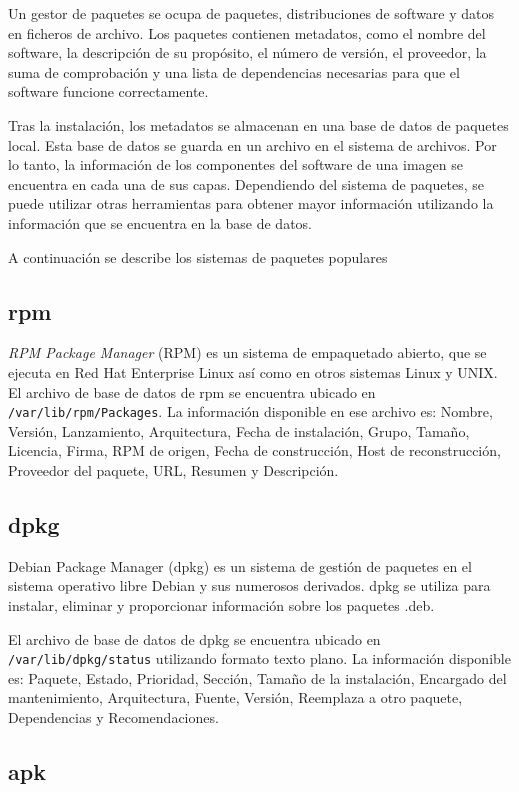 Un gestor de paquetes se ocupa de paquetes, distribuciones de software y datos en ficheros de archivo. Los paquetes contienen metadatos, como el nombre del software, la descripción de su propósito, el número de versión, el proveedor, la suma de comprobación y una lista de dependencias necesarias para que el software funcione correctamente. 

Tras la instalación, los metadatos se almacenan en una base de datos de paquetes local. Esta base de datos se guarda en un archivo en el sistema de archivos. Por lo tanto, la información de los componentes del software de una imagen se encuentra en cada una de sus capas.
Dependiendo del sistema de paquetes, se puede utilizar otras herramientas para obtener mayor información utilizando la información que se encuentra en la base de datos.

A continuación se describe los sistemas de paquetes populares

\subsection{rpm}\label{sub:rpm}
\emph{RPM Package Manager} (RPM) es un sistema de empaquetado abierto, que se ejecuta en Red Hat Enterprise Linux así como en otros sistemas Linux y UNIX.
El archivo de base de datos de rpm se encuentra ubicado en \verb|/var/lib/rpm/Packages|. La información disponible en ese archivo es: Nombre, Versión, Lanzamiento, Arquitectura, Fecha de instalación, Grupo, Tamaño, Licencia, Firma, RPM de origen, Fecha de construcción,  Host de reconstrucción, Proveedor del paquete, URL, Resumen y  Descripción.
\subsection{dpkg}\label{sub:dpkg}

Debian Package Manager (dpkg) es un sistema de gestión de paquetes en el sistema operativo libre Debian y sus numerosos derivados. dpkg se utiliza para instalar, eliminar y proporcionar información sobre los paquetes .deb. 

El archivo de base de datos de dpkg se encuentra ubicado en \verb|/var/lib/dpkg/status| utilizando formato texto plano.  La información disponible es: Paquete, Estado, Prioridad, Sección, Tamaño de la instalación, Encargado del mantenimiento, Arquitectura, Fuente, Versión, Reemplaza a otro paquete, Dependencias y Recomendaciones.

\subsection{apk}\label{sub:apk}

